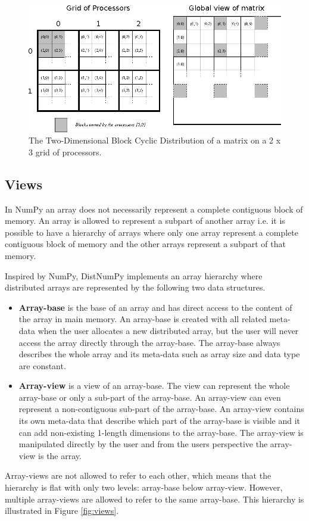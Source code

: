 \documentclass{sigplanconf}
\begin{document}
\begin{figure}
 \centering
 \includegraphics[width=\linewidth]{gfx/datalayout}
 \caption{The Two-Dimensional Block Cyclic Distribution of a matrix on a 2 x 3 grid of processors.}
 \label{fig:datalayout}
\end{figure}


\subsection{Views}
In NumPy an array does not necessarily represent a complete contiguous block of memory. An array is allowed to represent a subpart of another array i.e. it is possible to have a hierarchy of arrays where only one array represent a complete contiguous block of memory and the other arrays represent a subpart of that memory. 

Inspired by NumPy, DistNumPy implements an array hierarchy where distributed arrays are represented by the following two data structures.
\begin{itemize}
\item \textbf{Array-base} is the base of an array and has direct access to the content of the array in main memory. An array-base is created with all related meta-data when the user allocates a new distributed array, but the user will never access the array directly through the array-base. The array-base always describes the whole array and its meta-data such as array size and data type are constant.
\item \textbf{Array-view} is a view of an array-base. The view can represent the whole array-base or only a sub-part of the array-base. An array-view can even represent a non-contiguous sub-part of the array-base. An array-view contains its own meta-data that describe which part of the array-base is visible and it can add non-existing 1-length dimensions to the array-base. The array-view is manipulated directly by the user and from the users perspective the array-view is the array.
\end{itemize}
Array-views are not allowed to refer to each other, which means that the hierarchy is flat with only two levels: array-base below array-view. However, multiple array-views are allowed to refer to the same array-base. This hierarchy is illustrated in Figure \ref{fig:views}. 
\end{document}

